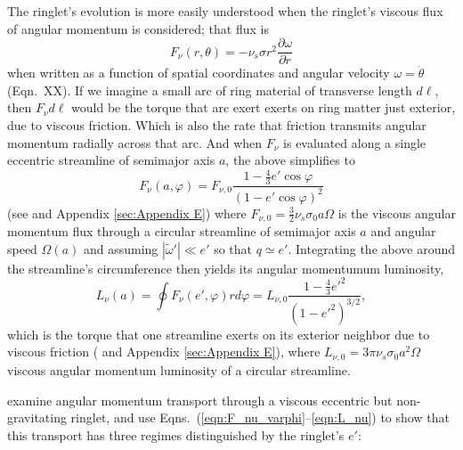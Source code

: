 \documentclass[preprint]{aastex62}
\begin{document}
The ringlet's evolution is more easily understood when the ringlet's viscous flux of angular momentum is 
considered; that flux is 
\begin{equation}
    \label{eqn:F_nu_theta}
    F_{\nu}(r, \theta) = -\nu_s \sigma r^2\frac{\partial\omega}{\partial r}
\end{equation}
\citep{HS13} when written as a function of spatial coordinates and
angular velocity $\omega=\dot{\theta}$ (Eqn.\ XX). If we imagine a small arc of 
ring material of transverse length $d\ell$, 
then $F_{\nu}d\ell$ would be the torque that arc exert exerts on
ring matter just exterior, due to viscous friction.
Which is also the rate that friction transmits angular momentum radially across that arc.
And when $F_{\nu}$ is evaluated along a single eccentric streamline of semimajor axis $a$, 
the above simplifies to
\begin{equation}
    \label{eqn:F_nu_varphi}
    F_{\nu}(a, \varphi) = F_{\nu,0}\frac{1-\frac{4}{3}e'\cos\varphi}{(1-e'\cos\varphi)^2}
\end{equation}
(see \citealt{BGT82} and Appendix \ref{sec:Appendix E})
where $F_{\nu,0}=\frac{3}{2}\nu_s\sigma_0a\Omega$ is the viscous angular momentum flux through a
circular streamline of semimajor axis $a$ and angular speed $\Omega(a)$ and assuming
$|\tilde{\omega}'|\ll e'$ so that $q\simeq e'$. Integrating the above
around the streamline's circumference then yields its angular momentumum luminosity,
\begin{equation}
    \label{eqn:L_nu}
    L_{\nu}(a) = \oint F_\nu(e', \varphi)rd\varphi = L_{\nu,0}\frac{1-\frac{4}{3}e'^2}{(1-e'^2)^{3/2}},
\end{equation}
which is the torque that one streamline exerts on its exterior neighbor due to viscous friction
(\citealt{BGT82} and Appendix \ref{sec:Appendix E}),
where $L_{\nu,0}=3\pi\nu_s\sigma_0a^2\Omega$ viscous angular momentum luminosity of a circular streamline.

\citet{BGT82} examine angular momentum transport through a viscous eccentric but non-gravitating ringlet, 
and use Eqns.\ (\ref{eqn:F_nu_varphi}--\ref{eqn:L_nu}) to show that this transport has three 
regimes distinguished by the ringlet's $e'$:
\end{document}
